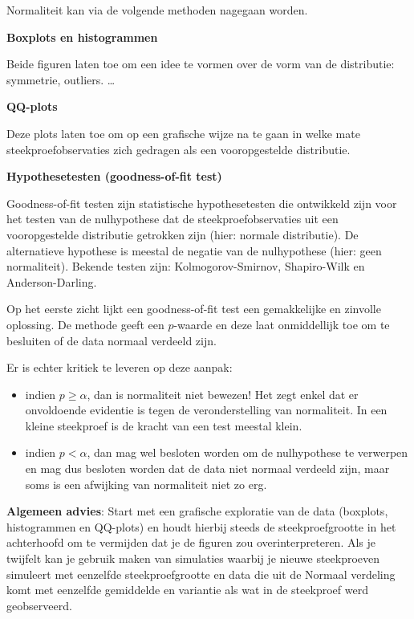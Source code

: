 \documentclass[
  12pt,dutch,coursenotes]{book}
\providecommand{\tightlist}{%
  \setlength{\itemsep}{0pt}\setlength{\parskip}{0pt}}
\theoremstyle{definition}
\theoremstyle{definition}
\theoremstyle{definition}
\theoremstyle{definition}
\theoremstyle{remark}
\begin{document}
Normaliteit kan via de volgende methoden nagegaan worden.

\textbf{Boxplots en histogrammen}

Beide figuren laten toe om een idee te vormen over de vorm van de distributie: symmetrie, outliers. \ldots

\textbf{QQ-plots}

Deze plots laten toe om op een grafische wijze na te gaan in welke mate steekproefobservaties zich gedragen als een vooropgestelde distributie.

\textbf{Hypothesetesten (goodness-of-fit test)}

Goodness-of-fit testen zijn statistische hypothesetesten die ontwikkeld zijn voor het testen van de nulhypothese dat de steekproefobservaties uit een vooropgestelde distributie getrokken zijn (hier: normale distributie). De alternatieve hypothese is meestal de negatie van de nulhypothese (hier: geen normaliteit). Bekende testen zijn: Kolmogorov-Smirnov, Shapiro-Wilk en Anderson-Darling.

Op het eerste zicht lijkt een goodness-of-fit test een gemakkelijke en zinvolle oplossing. De methode geeft een \(p\)-waarde en deze laat onmiddellijk toe om te besluiten of de data normaal verdeeld zijn.

Er is echter kritiek te leveren op deze aanpak:

\begin{itemize}
\tightlist
\item
  indien \(p\geq \alpha\), dan is normaliteit niet bewezen! Het zegt enkel dat er onvoldoende evidentie is tegen de veronderstelling van normaliteit. In een kleine steekproef is de kracht van een test meestal klein.
\item
  indien \(p<\alpha\), dan mag wel besloten worden om de nulhypothese te verwerpen en mag dus besloten worden dat de data niet normaal verdeeld zijn, maar soms is een afwijking van normaliteit niet zo erg.
\end{itemize}

\textbf{Algemeen advies}:
Start met een grafische exploratie van de data (boxplots, histogrammen en QQ-plots) en houdt hierbij steeds de steekproefgrootte in het achterhoofd om te vermijden dat je de figuren zou overinterpreteren. Als je twijfelt kan je gebruik maken van simulaties waarbij je nieuwe steekproeven simuleert met eenzelfde steekproefgrootte en data die uit de Normaal verdeling komt met eenzelfde gemiddelde en variantie als wat in de steekproef werd geobserveerd.
\end{document}
